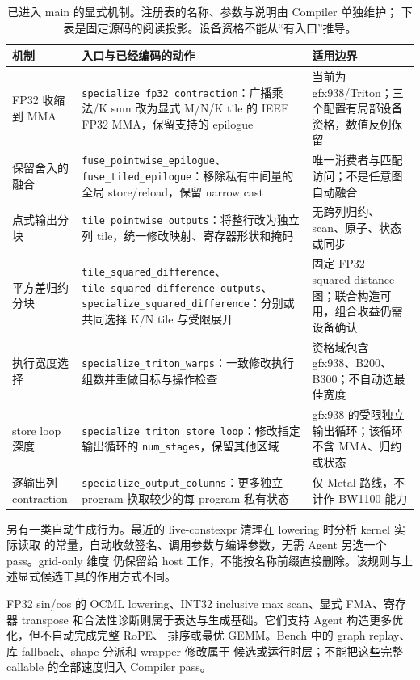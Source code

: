 \documentclass[UTF8,11pt,a4paper,fontset=none]{ctexart}
\renewcommand{\arraystretch}{1.34}
\newcommand{\code}[1]{\texttt{#1}}
\begin{document}
\begin{table}[htbp]
\centering\footnotesize\renewcommand{\arraystretch}{1.15}
\caption{已进入 main 的显式机制。注册表的名称、参数与说明由 Compiler 单独维护；
下表是固定源码的阅读投影。设备资格不能从“有入口”推导。}
\label{tab:bw-transforms}
\begin{tabularx}{\textwidth}{@{}>{\raggedright\arraybackslash}p{25mm}Y >{\raggedright\arraybackslash}p{43mm}@{}}
\toprule
{}机制 & 入口与已经编码的动作 & 适用边界 \\
\midrule
FP32 收缩到 MMA & \code{specialize\_fp32\_contraction}：广播乘法/K sum 改为显式 M/N/K tile 的 IEEE FP32 MMA，保留支持的 epilogue & 当前为 gfx938/Triton；三个配置有局部设备资格，数值反例保留 \\
保留舍入的融合 & \code{fuse\_pointwise\_epilogue}、\allowbreak\code{fuse\_tiled\_epilogue}：移除私有中间量的全局 store/reload，保留 narrow cast & 唯一消费者与匹配访问；不是任意图自动融合 \\
点式输出分块 & \code{tile\_pointwise\_outputs}：将整行改为独立列 tile，统一修改映射、寄存器形状和掩码 & 无跨列归约、scan、原子、状态或同步 \\
平方差归约分块 & \code{tile\_squared\_difference}、\allowbreak\code{tile\_squared\_difference\_outputs}、\allowbreak\code{specialize\_squared\_difference}：分别或共同选择 K/N tile 与受限展开 & 固定 FP32 squared-distance 图；联合构造可用，组合收益仍需设备确认 \\
执行宽度选择 & \code{specialize\_triton\_warps}：一致修改执行组数并重做目标与操作检查 & 资格域包含 gfx938、B200、B300；不自动选最佳宽度 \\
store loop 深度 & \code{specialize\_triton\_store\_loop}：修改指定输出循环的 \code{num\_stages}，保留其他区域 & gfx938 的受限独立输出循环；该循环不含 MMA、归约或状态 \\
逐输出列 contraction & \code{specialize\_output\_columns}：更多独立 program 换取较少的每 program 私有状态 & 仅 Metal 路线，不计作 BW1100 能力 \\
\bottomrule
\end{tabularx}
\end{table}

另有一类自动生成行为。最近的 live-constexpr 清理在 lowering 时分析 kernel 实际读取
的常量，自动收敛签名、调用参数与编译参数，无需 Agent 另选一个 pass。grid-only 维度
仍保留给 host 工作，不能按名称前缀直接删除。该规则与上述显式候选工具的作用方式不同。

FP32 sin/cos 的 OCML lowering、INT32 inclusive max scan、显式 FMA、寄存器 transpose
和合法性诊断则属于表达与生成基础。它们支持 Agent 构造更多优化，但不自动完成完整 RoPE、
排序或最优 GEMM。Bench 中的 graph replay、库 fallback、shape 分派和 wrapper 修改属于
候选或运行时层；不能把这些完整 callable 的全部速度归入 Compiler pass。
\FloatBarrier
\end{document}
